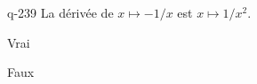 \begin{truefalse}{q-239}
La dérivée de $x\mapsto -1/x$ est $x\mapsto 1/x^2$.
\item* Vrai
\item Faux
\end{truefalse}

